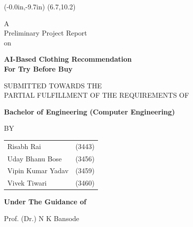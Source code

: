 \thisfancyput(-0.0in,-9.7in){
	\setlength{\unitlength}{1in}
	\framebox(6.7,10.2)
}
\setlength{\parindent}{0mm}
\begin{center}
	A \\ Preliminary Project Report \\ on

	\vspace*{1\baselineskip}

	{
		\bfseries \Large
		AI-Based Clothing Recommendation \\ For Try Before Buy \\
		\vspace*{1.5\baselineskip}
	}

	SUBMITTED TOWARDS THE \\
	PARTIAL FULFILLMENT OF THE REQUIREMENTS OF \\
	
	\vspace*{1.5\baselineskip}

	{
		\bfseries \large
		Bachelor of Engineering (Computer Engineering) \\
		\vspace*{1\baselineskip}

		BY \\
		\vspace*{1\baselineskip}
	}

	\begin{table}[h!]
		\centering
		\begin{tabular}{ l r }
			Risabh Rai \hspace{25mm} & (3443) \\
			Uday Bhanu Bose \hspace{25mm} & (3456) \\
			Vipin Kumar Yadav \hspace{25mm} & (3459) \\
			Vivek Tiwari \hspace{25mm} & (3460) \\
		\end{tabular}
	\end{table}

	\vspace*{0.5\baselineskip}

	{
		\bfseries \large
		Under The Guidance of \\  
		\vspace*{0.5\baselineskip}
	}

	Prof. (Dr.) N K Bansode\\[1cm]


\end{center}
